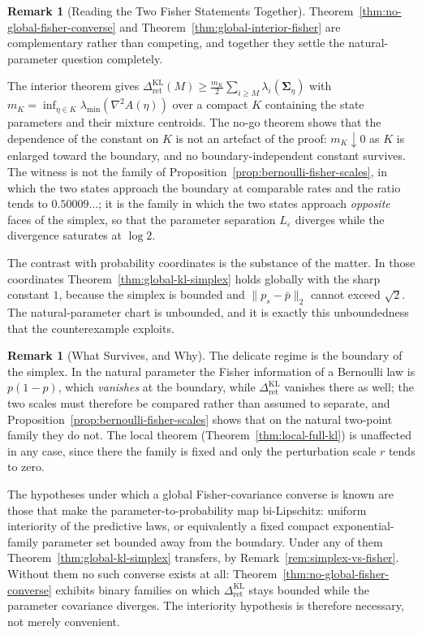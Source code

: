 \documentclass[12pt]{article}
\theoremstyle{definition}
\newtheorem{remark}[theorem]{Remark}
\newcommand{\RetKL}{\Delta_{\mathrm{ret}}^{\mathrm{KL}}}
\begin{document}
\begin{remark}[Reading the Two Fisher Statements Together]
\label{rem:fisher-nogo-reading}
Theorem~\ref{thm:no-global-fisher-converse} and
Theorem~\ref{thm:global-interior-fisher} are complementary rather than
competing, and together they settle the natural-parameter question completely.

The interior theorem gives $\RetKL(M)\ge\frac{m_K}{2}\sum_{i\ge M}
\lambda_i(\bm{\Sigma}_\eta)$ with $m_K=\inf_{\eta\in K}\lambda_{\min}(\nabla^2A(\eta))$
over a compact $K$ containing the state parameters and their mixture
centroids.  The no-go theorem shows that the dependence of the constant on $K$
is not an artefact of the proof: $m_K\downarrow0$ as $K$ is enlarged toward the
boundary, and no boundary-independent constant survives.  The witness is not
the family of Proposition~\ref{prop:bernoulli-fisher-scales}, in which the two
states approach the boundary at comparable rates and the ratio tends to
$0.50009\ldots$; it is the family in which the two states approach
\emph{opposite} faces of the simplex, so that the parameter separation
$L_\varepsilon$ diverges while the divergence saturates at $\log2$.

The contrast with probability coordinates is the substance of the matter.  In
those coordinates Theorem~\ref{thm:global-kl-simplex} holds globally with the
sharp constant $1$, because the simplex is bounded and $\|p_s-\bar p\|_2$
cannot exceed $\sqrt2$.  The natural-parameter chart is unbounded, and it is
exactly this unboundedness that the counterexample exploits.
\end{remark}

\begin{remark}[What Survives, and Why]
\label{rem:global-kl-what-survives}
The delicate regime is the boundary of the simplex.  In the natural parameter
the Fisher information of a Bernoulli law is $p(1-p)$, which \emph{vanishes} at
the boundary, while $\RetKL$ vanishes there as well; the two scales must
therefore be compared rather than assumed to separate, and
Proposition~\ref{prop:bernoulli-fisher-scales} shows that on the natural
two-point family they do not.  The local theorem
(Theorem~\ref{thm:local-full-kl}) is unaffected in any case, since there the
family is fixed and only the perturbation scale $r$ tends to zero.

The hypotheses under which a global Fisher-covariance converse is known are
those that make the parameter-to-probability map bi-Lipschitz: uniform
interiority of the predictive laws, or equivalently a fixed compact
exponential-family parameter set bounded away from the boundary.  Under any of
them Theorem~\ref{thm:global-kl-simplex} transfers, by
Remark~\ref{rem:simplex-vs-fisher}.  Without them no such converse exists at
all: Theorem~\ref{thm:no-global-fisher-converse} exhibits binary families on
which $\RetKL$ stays bounded while the parameter covariance diverges.  The
interiority hypothesis is therefore necessary, not merely convenient.
\end{remark}
\end{document}
